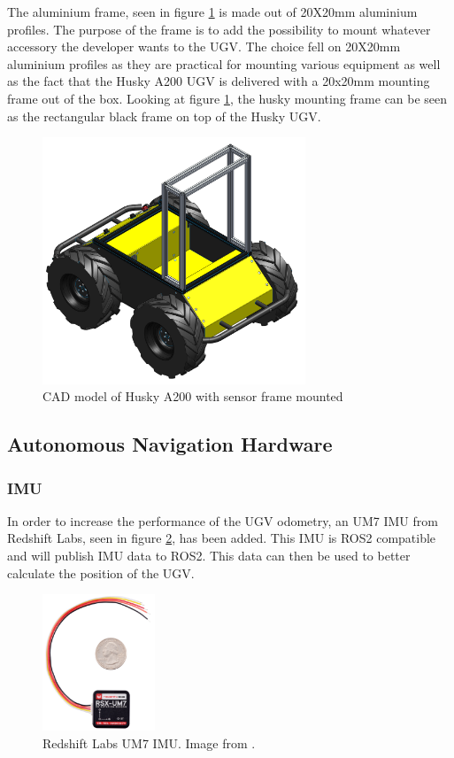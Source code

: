 The aluminium frame, seen in figure \ref{fig:M:H:AMF:userFrame} is made out of 20X20mm aluminium profiles. The purpose of the frame is to add the possibility to mount whatever accessory the developer wants to the UGV. The choice fell on 20X20mm aluminium profiles as they are practical for mounting various equipment as well as the fact that the Husky A200 UGV is delivered with a 20x20mm mounting frame out of the box. Looking at figure \ref{fig:M:H:AMF:userFrame}, the husky mounting frame can be seen as the rectangular black frame on top of the Husky UGV.

\begin{figure}[H]
  \centering
  \includegraphics[width = 0.7\textwidth]{Figures/husky_with_frame.png}
  \caption{CAD model of Husky A200 with sensor frame mounted}
  \label{fig:M:H:AMF:userFrame}
\end{figure}


\subsection{Autonomous Navigation Hardware}\label{sec:M:H:Autonomous Navigation Hardware}

\subsubsection{IMU}\label{sec:M:H:ANH:IMU}
In order to increase the performance of the UGV odometry, an UM7 IMU from Redshift Labs, seen in figure \ref{fig:um7_imu}, has been added. This IMU is ROS2 compatible and will publish IMU data to ROS2. This data can then be used to better calculate the position of the UGV. 

\begin{figure}[H]
  \centering
  \includegraphics[width = 0.3\textwidth]{Figures/um7_imu.png}
  \caption{Redshift Labs UM7 IMU. Image from \cite{um7_imu}.}
  \label{fig:um7_imu}
\end{figure}

